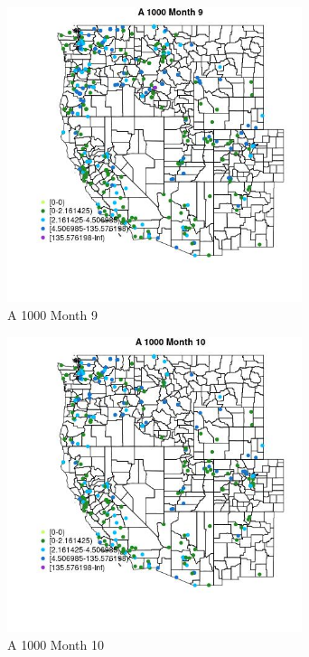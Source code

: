 \begin{figure} 
\centering  
\includegraphics[width=0.77\textwidth]{Code_Outputs/Report_ML_input_PM25_Step4_part_e_de_duplicated_aveswNAs_MapObsMo9A_1000.jpg} 
\caption{\label{fig:Report_ML_input_PM25_Step4_part_e_de_duplicated_aveswNAsMapObsMo9A_1000}A 1000 Month 9} 
\end{figure} 
 

\clearpage 

\begin{figure} 
\centering  
\includegraphics[width=0.77\textwidth]{Code_Outputs/Report_ML_input_PM25_Step4_part_e_de_duplicated_aveswNAs_MapObsMo10A_1000.jpg} 
\caption{\label{fig:Report_ML_input_PM25_Step4_part_e_de_duplicated_aveswNAsMapObsMo10A_1000}A 1000 Month 10} 
\end{figure} 
 

